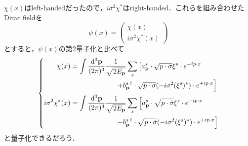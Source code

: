 \documentclass[pdflatex,unicode,ja=standard,12pt]{beamer}
\begin{document}
\begin{frame}%

  \frametitle{\subsecname}

  $\chi(x)$はleft-handedだったので，$i\sigma^2\chi^*$はright-handed．これらを組み合わせたDirac fieldを
  \begin{equation}
    \psi(x)
    =
    \begin{pmatrix}
      \chi(x) \\
      i\sigma^2 \chi^{*}(x)
    \end{pmatrix}
  \end{equation}
  とすると，$\psi(x)$の第2量子化と比べて
  \begin{equation}
    \left\{
      \begin{alignedat}{1}        
        \chi(x)
        &=    
        \int\frac{\dd^3 \mathbf{p}}{(2\pi)^3}
        \frac{1}{\sqrt{2E_{\mathbf{p}}}}
        \sum_s
        \left[  
          a_{\mathbf{p}}^s \cdot \sqrt{p\cdot \sigma}\xi^s \cdot e^{-ip\cdot x}
        \right.
        \\
        &\hspace{2.3cm}
        \left.
          +
          {b_{\mathbf{p}}^s}^{\dag} \cdot \sqrt{p\cdot \sigma}(-i\sigma^2(\xi^s)^{*}) \cdot e^{+ip\cdot x}
        \right]
        \\
        i\sigma^2\chi^{*}(x)
        &=
        \int\frac{\dd^3 \mathbf{p}}{(2\pi)^3}
        \frac{1}{\sqrt{2E_{\mathbf{p}}}}
        \sum_s
        \left[  
          a_{\mathbf{p}}^s \cdot \sqrt{p\cdot \bar{\sigma}}\xi^s \cdot e^{-ip\cdot x}
        \right.
        \\
        &\hspace{2.3cm}
        \left.
          -
          {b_{\mathbf{p}}^s}^{\dag} \cdot \sqrt{p\cdot \bar{\sigma}}(-i\sigma^2(\xi^s)^{*}) \cdot e^{+ip\cdot x}
        \right]
      \end{alignedat}
    \right.
    \label{spinor_quantized}
  \end{equation}
  と量子化できるだろう．

\end{frame}
\end{document}
